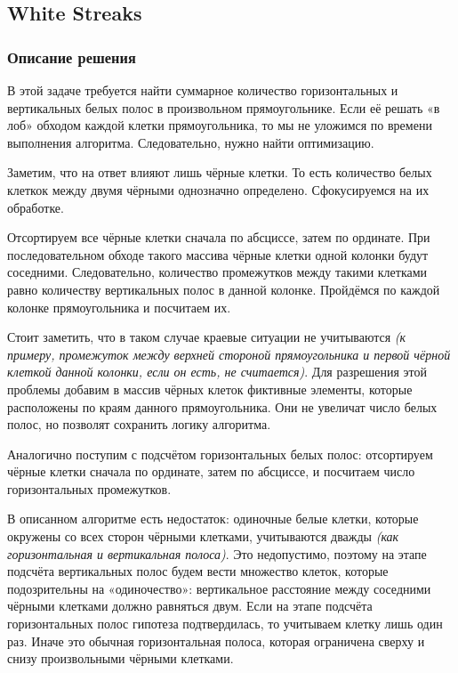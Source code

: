 \subsection{White Streaks}

\subsubsection{Описание решения}

В этой задаче требуется найти суммарное количество горизонтальных и вертикальных белых полос в произвольном прямоугольнике. Если её решать «в лоб» обходом каждой клетки прямоугольника, то мы не уложимся по времени выполнения алгоритма. Следовательно, нужно найти оптимизацию.

Заметим, что на ответ влияют лишь чёрные клетки. То есть количество белых клеткок между двумя чёрными однозначно определено. Сфокусируемся на их обработке.

Отсортируем все чёрные клетки сначала по абсциссе, затем по ординате. При последовательном обходе такого массива чёрные клетки одной колонки будут соседними. Следовательно, количество промежутков между такими клетками равно количеству вертикальных полос в данной колонке. Пройдёмся по каждой колонке прямоугольника и посчитаем их.

Стоит заметить, что в таком случае краевые ситуации не учитываются \textit{(к примеру, промежуток между верхней стороной прямоугольника и первой чёрной клеткой данной колонки, если он есть, не считается)}. Для разрешения этой проблемы добавим в массив чёрных клеток фиктивные элементы, которые расположены по краям данного прямоугольника. Они не увеличат число белых полос, но позволят сохранить логику алгоритма.

Аналогично поступим с подсчётом горизонтальных белых полос: отсортируем чёрные клетки сначала по ординате, затем по абсциссе, и посчитаем число горизонтальных промежутков.

В описанном алгоритме есть недостаток: одиночные белые клетки, которые окружены со всех сторон чёрными клетками, учитываются дважды \textit{(как горизонтальная и вертикальная полоса)}. Это недопустимо, поэтому на этапе подсчёта вертикальных полос будем вести множество клеток, которые подозрительны на «одиночество»: вертикальное расстояние между соседними чёрными клетками должно равняться двум. Если на этапе подсчёта горизонтальных полос гипотеза подтвердилась, то учитываем клетку лишь один раз. Иначе это обычная горизонтальная полоса, которая ограничена сверху и снизу произвольными чёрными клетками.

